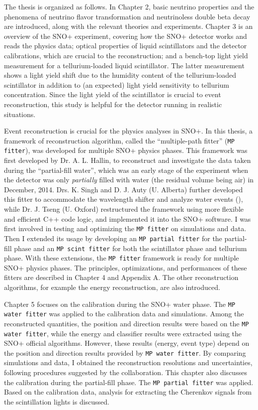 The thesis is organized as follows. In Chapter 2, basic neutrino properties and the phenomena of neutrino flavor transformation and neutrinoless double beta decay are introduced, along with the relevant theories and experiments. Chapter 3 is an overview of the SNO+ experiment, covering how the SNO+ detector works and reads the physics data; optical properties of liquid scintillators and the detector calibrations, which are crucial to the reconstruction; and a bench-top light yield measurement for a tellurium-loaded liquid scintillator. The latter measurement shows a light yield shift due to the humidity content of the tellurium-loaded scintillator in addition to (an expected) light yield sensitivity to tellurium concentration. Since the light yield of the scintillator is crucial to event reconstruction, this study is helpful for the detector running in realistic situations.

Event reconstruction is crucial for the physics analyses in SNO+. In this thesis, a framework of reconstruction algorithm, called the ``multiple-path fitter'' (\texttt{MP fitter}), was developed for multiple SNO+ physics phases. This framework was first developed by Dr. A. L. Hallin, to reconstruct and investigate the data taken during the ``partial-fill water'', which was an early stage of the experiment when the detector was only {\em partially} filled with water (the residual volume being air) in December, 2014\cite{partialWater}. Drs. K. Singh and D. J. Auty (U. Alberta) further developed this fitter to accommodate the wavelength shifter and analyze water events (\cite{davidPartialWater, kalpanaWLS, kalpanaWLS2, kalpanaMPFitter}), while Dr. J. Tseng (U. Oxford) restructured the framework using more flexible and efficient C++ code logic, and implemented it into the SNO+ software\cite{jieMPW}. I was first involved in testing and optimizing the \texttt{MP fitter} on simulations and data. Then I extended its usage by developing an \texttt{MP partial fitter} for the partial-fill phase and an \texttt{MP scint fitter} for both the scintillator phase and tellurium phase. With these extensions, the \texttt{MP fitter} framework is ready for multiple SNO+ physics phases. The principles, optimizations, and performances of these fitters are described in Chapter 4 and Appendix A. The other reconstruction algorithms, for example the energy reconstruction, are also introduced.

Chapter 5 focuses on the calibration during the SNO+ water phase. The \texttt{MP water fitter} was applied to the calibration data and simulations. Among the reconstructed quantities, the position and direction results were based on the \texttt{MP water fitter}, while the energy and classifier results were extracted using the SNO+ official algorithms. However, these results (energy, event type) depend on the position and direction results provided by \texttt{MP water fitter}. By comparing simulations and data, I obtained the reconstruction resolutions and uncertainties, following procedures suggested by the collaboration. This chapter also discusses the calibration during the partial-fill phase. The \texttt{MP partial fitter} was applied. Based on the calibration data, analysis for extracting the Cherenkov signals from the scintillation lights is discussed.

